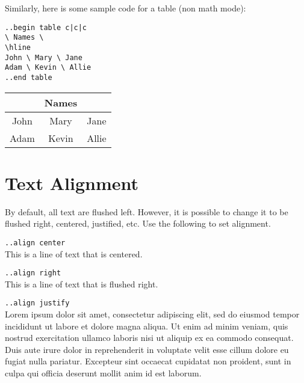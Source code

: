 \documentclass[12pt]{article}
\begin{document}
\begin{flushleft}
\bigskip

Similarly, here is some sample code for a table (non math mode): \\
\medskip

\verb=..begin table c|c|c= \\
\verb|\ Names \| \\
\verb|\hline| \\
\verb|John \ Mary \ Jane| \\
\verb|Adam \ Kevin \ Allie| \\
\verb|..end table|

\bigskip

\begin{tabular}{c|c|c}
& Names & \\
\hline
John & Mary & Jane \\
Adam & Kevin & Allie 
\end{tabular}

\newpage

\section*{Text Alignment}

By default, all text are flushed left. However, it is possible to change it to be flushed right, centered, justified, etc. Use the following to set alignment.

\end{flushleft}

\begin{center}
\verb|..align center|\\
This is a line of text that is centered.

\end{center}

\begin{flushright}
\verb|..align right|\\
This is a line of text that is flushed right.

\end{flushright}
\verb|..align justify|\\
Lorem ipsum dolor sit amet, consectetur adipiscing elit, sed do eiusmod tempor incididunt ut labore et dolore magna aliqua. Ut enim ad minim veniam, quis nostrud exercitation ullamco laboris nisi ut aliquip ex ea commodo consequat. Duis aute irure dolor in reprehenderit in voluptate velit esse cillum dolore eu fugiat nulla pariatur. Excepteur sint occaecat cupidatat non proident, sunt in culpa qui officia deserunt mollit anim id est laborum.
\end{document}

